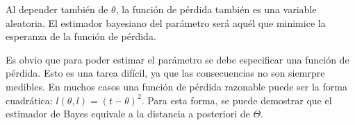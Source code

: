 Al depender tambi\'en de $\theta$, la funci\'on de p\'erdida tambi\'en es una variable aleatoria. El estimador bayesiano del par\'ametro ser\'a aqu\'el que minimice la esperanza de la funci\'on de p\'erdida.

Es obvio que para poder estimar el par\'ametro se debe especificar una funci\'on de p\'erdida. Esto es una tarea dif\'icil, ya que las consecuencias no son siemrpre medibles. En muchos casos una funci\'on de p\'erdida razonable puede ser la forma cuadr\'atica: $l(\theta, l)=(t-\theta)^2$. Para esta forma, se puede demostrar que el estimador de Bayes equivale a la distancia a posteriori de $\Theta$.

